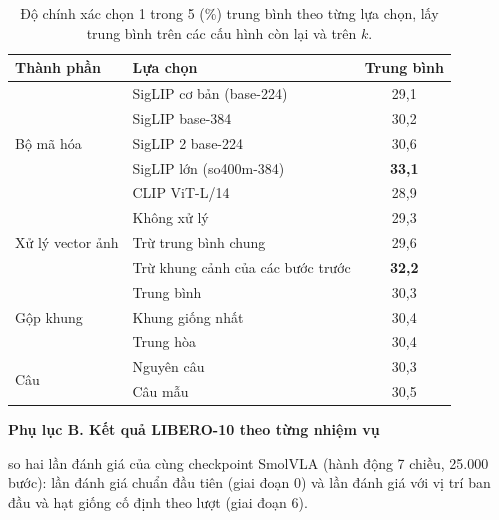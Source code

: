 \documentclass[a4paper,oneside]{report}
\newcommand{\mucnho}[1]{\par\vspace{4pt}\noindent\textbf{#1}\par\nobreak}
\begin{document}
\begin{table}[ht]
\centering
\caption{Độ chính xác chọn 1 trong 5 (\%) trung bình theo từng lựa chọn, lấy trung bình trên các cấu hình còn lại và trên $k$.}
\label{tab:grid_factor}
\small
\begin{tabular}{llc}
\toprule
Thành phần & Lựa chọn & Trung bình \\
\midrule
\multirow{5}{*}{Bộ mã hóa} & SigLIP cơ bản (base-224) & 29,1 \\
 & SigLIP base-384 & 30,2 \\
 & SigLIP 2 base-224 & 30,6 \\
 & SigLIP lớn (so400m-384) & \textbf{33,1} \\
 & CLIP ViT-L/14 & 28,9 \\
\midrule
\multirow{3}{*}{Xử lý vector ảnh} & Không xử lý & 29,3 \\
 & Trừ trung bình chung & 29,6 \\
 & Trừ khung cảnh của các bước trước & \textbf{32,2} \\
\midrule
\multirow{3}{*}{Gộp khung} & Trung bình & 30,3 \\
 & Khung giống nhất & 30,4 \\
 & Trung hòa & 30,4 \\
\midrule
\multirow{2}{*}{Câu} & Nguyên câu & 30,3 \\
 & Câu mẫu & 30,5 \\
\bottomrule
\end{tabular}
\end{table}

\mucnho{Phụ lục B. Kết quả LIBERO-10 theo từng nhiệm vụ}

 so hai lần đánh giá của cùng checkpoint SmolVLA (hành động 7 chiều, 25.000 bước): lần đánh giá chuẩn đầu tiên (giai đoạn 0) và lần đánh giá với vị trí ban đầu và hạt giống cố định theo lượt (giai đoạn 6).
\end{document}
